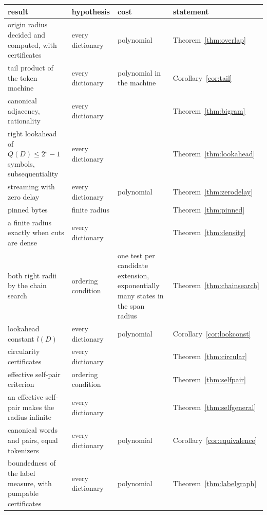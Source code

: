 \documentclass[11pt,a4paper]{article}
\theoremstyle{definition}
\theoremstyle{plain}
\begin{document}
\begin{table}[!t]
\centering
\small
\begin{tabular}{@{}>{\raggedright\arraybackslash}p{}>{\raggedright\arraybackslash}p{}
  >{\raggedright\arraybackslash}p{}>{\raggedright\arraybackslash}p{}@{}}
\toprule
result & hypothesis & cost & statement \\
\midrule
origin radius decided and computed, with certificates & every dictionary & polynomial &
Theorem~\ref{thm:overlap} \\
\addlinespace
tail product of the token machine & every dictionary & polynomial in the machine & Corollary~\ref{cor:tail} \\
\addlinespace
canonical adjacency, rationality & every dictionary & & Theorem~\ref{thm:bigram} \\
\addlinespace
right lookahead of \(Q(D) \le 2^s - 1\) symbols, subsequentiality & every dictionary & &
Theorem~\ref{thm:lookahead} \\
\addlinespace
streaming with zero delay & every dictionary & polynomial & Theorem~\ref{thm:zerodelay} \\
\addlinespace
pinned bytes & finite radius & & Theorem~\ref{thm:pinned} \\
\addlinespace
a finite radius exactly when cuts are dense & every dictionary & & Theorem~\ref{thm:density} \\
\addlinespace
both right radii by the chain search & ordering condition
  & one test per candidate extension, exponentially many states in the span
radius & Theorem~\ref{thm:chainsearch} \\
\addlinespace
lookahead constant \(l(D)\) & every dictionary & polynomial & Corollary~\ref{cor:lookconst} \\
\addlinespace
circularity certificates & every dictionary & & Theorem~\ref{thm:circular} \\
\addlinespace
effective self-pair criterion & ordering condition & & Theorem~\ref{thm:selfpair} \\
\addlinespace
an effective self-pair makes the radius infinite & every dictionary & & Theorem~\ref{thm:selfgeneral} \\
\addlinespace
canonical words and pairs, equal tokenizers & every dictionary & polynomial &
Corollary~\ref{cor:equivalence} \\
\addlinespace
boundedness of the label measure, with pumpable certificates & every dictionary & polynomial &
Theorem~\ref{thm:labelgraph} \\

\end{tabular}
\end{table}
\end{document}
